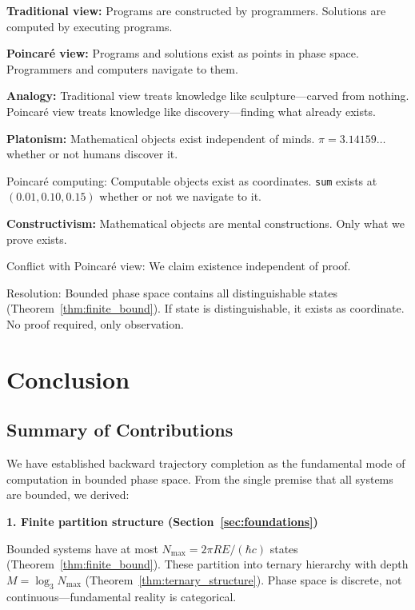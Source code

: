 \documentclass[twocolumn,10pt]{article}
\theoremstyle{definition}
\theoremstyle{remark}
\newcommand{\Nmax}{N_{\max}}
\begin{document}
\textbf{Traditional view:} Programs are constructed by programmers. Solutions are computed by executing programs.

\vspace{0.2cm}
\noindent\textbf{Poincaré view:} Programs and solutions exist as points in phase space. Programmers and computers navigate to them.

\vspace{0.2cm}
\noindent\textbf{Analogy:} Traditional view treats knowledge like sculpture—carved from nothing. Poincaré view treats knowledge like discovery—finding what already exists.

\vspace{0.2cm}
\noindent\textbf{Platonism:} Mathematical objects exist independent of minds. $\pi = 3.14159\ldots$ whether or not humans discover it.

Poincaré computing: Computable objects exist as coordinates. \texttt{sum} exists at $(0.01, 0.10, 0.15)$ whether or not we navigate to it.

\vspace{0.2cm}
\noindent\textbf{Constructivism:} Mathematical objects are mental constructions. Only what we prove exists.

Conflict with Poincaré view: We claim existence independent of proof.

Resolution: Bounded phase space contains all distinguishable states (Theorem~\ref{thm:finite_bound}). If state is distinguishable, it exists as coordinate. No proof required, only observation.

\section{Conclusion}
\label{sec:conclusion}

\subsection{Summary of Contributions}

We have established backward trajectory completion as the fundamental mode of computation in bounded phase space. From the single premise that all systems are bounded, we derived:

\vspace{0.2cm}
\noindent\textbf{1. Finite partition structure (Section~\ref{sec:foundations})}

Bounded systems have at most $\Nmax = 2\pi RE/(\hbar c)$ states (Theorem~\ref{thm:finite_bound}). These partition into ternary hierarchy with depth $M = \log_3 \Nmax$ (Theorem~\ref{thm:ternary_structure}). Phase space is discrete, not continuous—fundamental reality is categorical.
\end{document}
